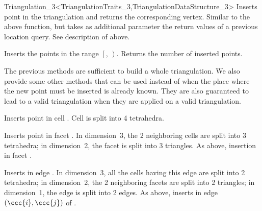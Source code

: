 \begin{ccRefClass}{Triangulation_3<TriangulationTraits_3,TriangulationDataStructure_3>}
{Inserts point  in the triangulation and returns the corresponding
 vertex. Similar to the above  function, but takes as additional
 parameter the return values of a previous location query.  See description of
  above.}

{Inserts the points in the range $\left[\right.$,
$\left.\right)$.  Returns the number of inserted points.
}

The previous methods are sufficient to build a whole triangulation. We
also provide some other methods that can be used instead of
 when the place where the new point  must be inserted
is already known. They are also guaranteed to lead to a valid
triangulation when they are applied on a valid triangulation.

{Inserts point  in cell . Cell  is split into 4
tetrahedra.
} 

{Inserts point  in facet . In dimension~3, the 2
neighboring cells are split into 3 tetrahedra; in dimension~2, the facet 
is split into 3 triangles.
}
\ccGlue
{}
{As above, insertion in facet .
}

{Inserts  in edge . In dimension~3, 
all the cells having this edge are split into 2 tetrahedra; in
dimension~2, the 2 neighboring facets are split into 2 triangles; in
dimension~1, the edge is split into 2 edges.
}
\ccGlue
{} 
{As above, inserts  in edge $(\ccc{i}, \ccc{j})$ of .
} 


\end{ccRefClass}
